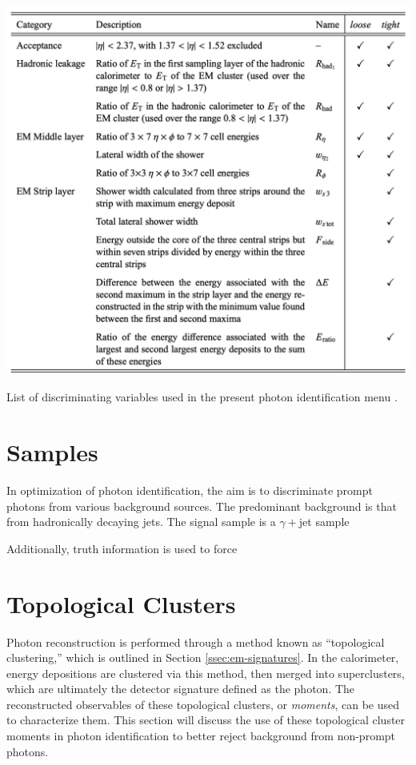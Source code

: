 \begin{table}[!thp]
    \centering
    \includegraphics[width=.90\textwidth]{chapters/chapter4_photonID/images/ss-table.png}
    \caption[List of discriminating variables used in the present photon identification menu.]
    {List of discriminating variables used in the present photon identification menu \cite{r1-photonID}.}
    \label{tab:ss-vars-table}
\end{table}

\section{Samples}

In optimization of photon identification, the aim is to discriminate prompt photons from various background sources. The predominant background is that from hadronically decaying jets. The signal sample is a $\gamma+$jet sample

Additionally, truth information is used to force 


\section{Topological Clusters}

Photon reconstruction is performed through a method known as ``topological clustering,'' which is outlined in Section \ref{ssec:em-signatures}. In the calorimeter, energy depositions are clustered via this method, then merged into superclusters, which are ultimately the detector signature defined as the photon. The reconstructed observables of these topological clusters, or \textit{moments}, can be used to characterize them. This section will discuss the use of these topological cluster moments in photon identification to better reject background from non-prompt photons.


